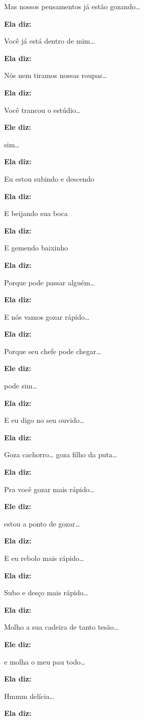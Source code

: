 Mas nossos pensamentos já estão gozando…

\textbf{Ela diz:}

Você já está dentro de mim…

\textbf{Ela diz:}

Nós nem tiramos nossas roupas…

\textbf{Ela diz:}

Você trancou o estúdio…

\textbf{Ele diz:}

sim…

\textbf{Ela diz:}

Eu estou subindo e descendo

\textbf{Ela diz:}

E beijando sua boca

\textbf{Ela diz:}

E gemendo baixinho

\textbf{Ela diz:}

Porque pode passar alguém…

\textbf{Ela diz:}

E nós vamos gozar rápido…

\textbf{Ela diz:}

Porque seu chefe pode chegar…

\textbf{Ele diz:}

pode sim…

\textbf{Ela diz:}

E eu digo no seu ouvido…

\textbf{Ela diz:}

Goza cachorro… goza filho da puta…

\textbf{Ela diz:}

Pra você gozar mais rápido…

\textbf{Ele diz:}

estou a ponto de gozar…

\textbf{Ela diz:}

E eu rebolo mais rápido…

\textbf{Ela diz:}

Subo e desço mais rápido…

\textbf{Ela diz:}

Molho a sua cadeira de tanto tesão…

\textbf{Ele diz:}

e molha o meu pau todo…

\textbf{Ela diz:}

Hmmm delícia…

\textbf{Ela diz:}

